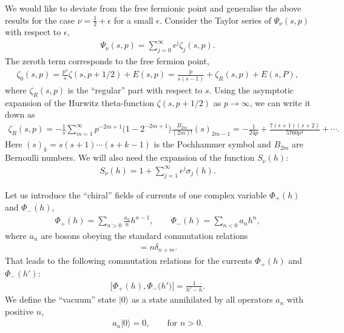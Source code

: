 \documentclass[pdftex]{sigma}
\numberwithin{equation}{section}
\begin{document}
We would like to deviate from the free fermionic point and generalise the above results for the case $\nu=\frac{1}{2}+\epsilon$ for a small $\epsilon$. Consider the Taylor series of $\Psi_\nu(s, p)$ with respect to $\epsilon$,
\begin{align*}%
\Psi_\nu(s, p)=\sum_{j=0}^{\infty}\epsilon^j \zeta_j(s, p).
\end{align*}
The zeroth term corresponds to the free fermion point,
\begin{align*}
\zeta_0(s, p)=\frac{p^s}{s}\zeta(s, p+1/2)+E(s, p)=\frac{p}{s(s-1)}+\zeta_R(s, p)+E(s, P),
\end{align*}
where $\zeta_R(s, p)$ is the ``regular'' part with respect to $s$. Using the asymptotic expansion of the Hurwitz theta-function $\zeta(s, p+1/2)$ as $p\rightarrow\infty$, we can write it down as
\begin{align*}
\zeta_R(s, p)=-\frac{1}{s}\sum_{m=1}^{\infty}p^{-2m+1}\bigl(1-2^{-2m+1}\bigr)\frac{B_{2m}}{(2m)!}(s)_{2m-1}=
               -\frac{1}{24p}+\frac{7(s+1)(s+2)}{5760p^3}+\cdots .
\end{align*}
Here $(s)_k=s(s+1)\cdots(s+k-1)$ is the Pochhammer symbol and $B_{2m}$ are Bernoulli numbers. We will also need the expansion of the function $S_\nu(h)$:
\begin{align}\label{Sh_Expansion_Epsilon}
S_\nu(h)=1+\sum_{j=1}^{\infty}\epsilon^j \sigma_j(h).
\end{align}

Let us introduce the ``chiral'' fields of currents of one complex variable $\Phi_{+}(h)$ and $\Phi_{-}(h)$,
\begin{align*}
\Phi_{+}(h)=\sum_{n>0}\frac{a_n}{n} h^{n-1}, \qquad \Phi_{-}(h)=\sum_{n<0}a_n h^n,
\end{align*}
where $a_n$ are bosons obeying the standard commutation relations
\begin{align*}%
[a_n, a_m]=n \delta_{n+m}.
\end{align*}
That leads to the following commutation relations for the currents $\Phi_{+}(h)$ and $\Phi_{-}(h')$:
\begin{align*}
\big[\Phi_+(h), \Phi_-\bigl(h'\bigr)\big]=\frac{1}{h'-h}.
\end{align*}
We define the ``vacuum'' state $|0\rangle$ as a state annihilated by all operators $a_n$ with positive $n$,
\begin{align*}
a_n|0\rangle=0, \qquad\text{for } n>0.
\end{align*}
\end{document}

